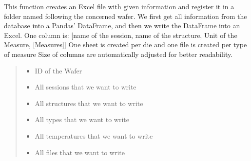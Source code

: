 \documentclass[letterpaper,10pt,english]{sphinxmanual}
\begin{document}

\begin{fulllineitems}
\label{\detokenize{excel:excel.wanted_excel}}
\pysigstartsignatures
{}
\pysigstopsignatures
\sphinxAtStartPar
This function creates an Excel file with given information and register it in a folder named following the concerned wafer.
We first get all information from the database into a Pandas’ DataFrame, and then we write the DataFrame into an Excel.
One column is: {[}name of the session, name of the structure, Unit of the Measure, {[}Measures{]}{]}
One sheet is created per die and one file is created per type of measure
Size of columns are automatically adjusted for better readability.
\begin{quote}\begin{description}
\begin{itemize}
\item {} 
\sphinxAtStartPar
{} \textendash{} ID of the Wafer

\item {} 
\sphinxAtStartPar
{} \textendash{} All sessions that we want to write

\item {} 
\sphinxAtStartPar
{} \textendash{} All structures that we want to write

\item {} 
\sphinxAtStartPar
{} \textendash{} All types that we want to write

\item {} 
\sphinxAtStartPar
{} \textendash{} All temperatures that we want to write

\item {} 
\sphinxAtStartPar
{} \textendash{} All files that we want to write


\end{itemize}
\end{description}
\end{quote}
\end{fulllineitems}
\end{document}
